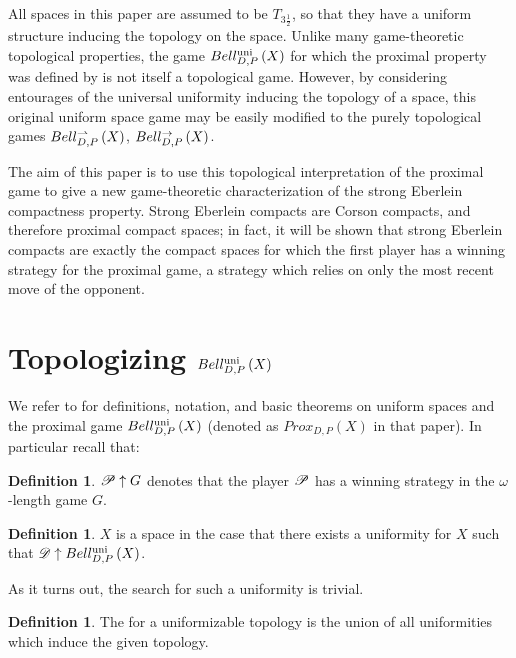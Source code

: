 \documentclass{amsart}
\theoremstyle{definition}
\newtheorem{definition}[theorem]{Definition}
\begin{document}
  All spaces in this paper are assumed to be \(T_{3\frac{1}{2}}\), so that they
  have a uniform structure inducing the topology on the space.
  Unlike many game-theoretic topological properties, the game \(Bell_{D,P}^{\textrm{uni}}\left({X}\right)\)
  for which the proximal property was defined by is not itself a topological
  game. However, by considering entourages of the universal uniformity
  inducing the topology of a space, this original uniform space game may be
  easily modified to the purely topological games
  \(Bell_{D,P}^{\rightharpoonup}\left({X}\right)\), \(Bell_{D,P}^{\to}\left({X}\right)\).

  The aim of this paper is to use this topological interpretation of the
  proximal game to give a new game-theoretic characterization of the
  strong Eberlein compactness property. Strong Eberlein compacts are Corson
  compacts, and therefore proximal compact spaces; in fact, it will be shown
  that strong Eberlein compacts are exactly the compact spaces for which the
  first player has a  winning strategy for the proximal game,
  a strategy which relies on only the most recent move of the opponent.


\section{Topologizing \(Bell_{D,P}^{\textrm{uni}}\left({X}\right)\)}

  We refer to \cite{MR3227201} for definitions, notation, and basic theorems on
  uniform spaces and the proximal game \(Bell_{D,P}^{\textrm{uni}}\left({X}\right)\) (denoted as
  \(Prox_{D,P}(X)\) in that paper). In particular recall that:

  \begin{definition}
    \(\mathscr{P} \uparrow G\) denotes that the player \(\mathscr{P}\) has a winning strategy
    in the \(\omega\)-length game \(G\).
  \end{definition}

  \begin{definition}
    \(X\) is a  space in the case that there exists a uniformity
    for \(X\) such that \(\mathscr{D}\uparrow Bell_{D,P}^{\textrm{uni}}\left({X}\right)\).
  \end{definition}

  As it turns out, the search for such a uniformity is trivial.

  \begin{definition}
    The  for a uniformizable topology is the
    union of all uniformities which induce the given topology.
  \end{definition}
\end{document}
